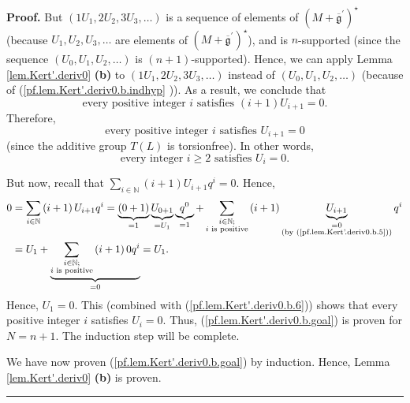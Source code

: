 \documentclass[numbers=enddot,12pt,final,onecolumn,notitlepage]{scrartcl}%
\theoremstyle{definition}
\newenvironment{proof}[1][Proof]{\noindent\textbf{#1.} }{\ \rule{0.5em}{0.5em}}
\let\sumnonlimits\sum
\renewcommand{\sum}{\sumnonlimits\limits}
\begin{document}
\begin{proof}
But $\left(  1U_{1},2U_{2},3U_{3},\ldots\right)  $ is a sequence of elements
of $\left(  M+\overline{\mathfrak{g}}^{\prime}\right)  ^{\star}$ (because
$U_{1},U_{2},U_{3},\ldots$ are elements of $\left(  M+\overline{\mathfrak{g}%
}^{\prime}\right)  ^{\star}$), and is $n$-supported (since the sequence
$\left(  U_{0},U_{1},U_{2},\ldots\right)  $ is $\left(  n+1\right)
$-supported). Hence, we can apply Lemma \ref{lem.Kert'.deriv0} \textbf{(b)} to
$\left(  1U_{1},2U_{2},3U_{3},\ldots\right)  $ instead of $\left(  U_{0}%
,U_{1},U_{2},\ldots\right)  $ (because of (\ref{pf.lem.Kert'.deriv0.b.indhyp}%
)). As a result, we conclude that
\begin{equation}
\text{every positive integer }i\text{ satisfies }\left(  i+1\right)
U_{i+1}=0. \label{pf.lem.Kert'.deriv0.b.4}%
\end{equation}
Therefore,
\begin{equation}
\text{every positive integer }i\text{ satisfies }U_{i+1}=0
\label{pf.lem.Kert'.deriv0.b.5}%
\end{equation}
(since the additive group $T\left(  L\right)  $ is torsionfree). In other
words,%
\begin{equation}
\text{every integer }i\geq2\text{ satisfies }U_{i}=0.
\label{pf.lem.Kert'.deriv0.b.6}%
\end{equation}


But now, recall that $\sum_{i\in\mathbb{N}}\left(  i+1\right)  U_{i+1}q^{i}%
=0$. Hence,%
\begin{align*}
0  &  =\sum_{i\in\mathbb{N}}\left(  i+1\right)  U_{i+1}q^{i}%
=\underbrace{\left(  0+1\right)  }_{=1}\underbrace{U_{0+1}}_{=U_{1}%
}\underbrace{q^{0}}_{=1}+\sum_{\substack{i\in\mathbb{N};\\i\text{ is
positive}}}\left(  i+1\right)  \underbrace{U_{i+1}}_{\substack{=0\\\text{(by
(\ref{pf.lem.Kert'.deriv0.b.5}))}}}q^{i}\\
&  =U_{1}+\underbrace{\sum_{\substack{i\in\mathbb{N};\\i\text{ is positive}%
}}\left(  i+1\right)  0q^{i}}_{=0}=U_{1}.
\end{align*}
Hence, $U_{1}=0$. This (combined with (\ref{pf.lem.Kert'.deriv0.b.6})) shows
that every positive integer $i$ satisfies $U_{i}=0$. Thus,
(\ref{pf.lem.Kert'.deriv0.b.goal}) is proven for $N=n+1$. The induction step
will be complete.

We have now proven (\ref{pf.lem.Kert'.deriv0.b.goal}) by induction. Hence,
Lemma \ref{lem.Kert'.deriv0} \textbf{(b)} is proven.
\end{proof}
\end{document}
